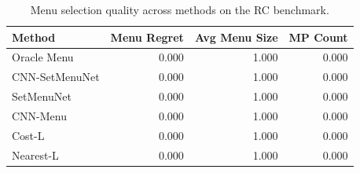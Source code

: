 \begin{table}[t]
\centering
\small
\setlength{\tabcolsep}{4pt}
\caption{Menu selection quality across methods on the RC benchmark.}
\label{tab:smoke_work2_main_menu_regret}
\begin{tabular}{@{}lrrr@{}}
\hline
Method & Menu Regret & Avg Menu Size & MP Count \\
\hline
Oracle Menu & 0.000 & 1.000 & 0.000 \\
CNN-SetMenuNet & 0.000 & 1.000 & 0.000 \\
SetMenuNet & 0.000 & 1.000 & 0.000 \\
CNN-Menu & 0.000 & 1.000 & 0.000 \\
Cost-L & 0.000 & 1.000 & 0.000 \\
Nearest-L & 0.000 & 1.000 & 0.000 \\
\hline
\end{tabular}
\end{table}
